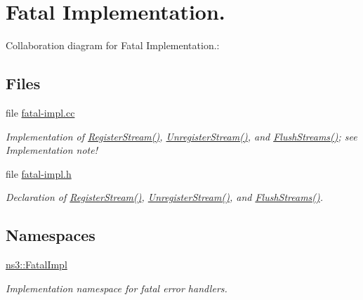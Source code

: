 \hypertarget{group__fatalimpl}{}\section{Fatal Implementation.}
\label{group__fatalimpl}
Collaboration diagram for Fatal Implementation.\+:
\subsection*{Files}
\begin{DoxyCompactItemize}
\item 
file \hyperlink{fatal-impl_8cc}{fatal-\/impl.\+cc}
\begin{DoxyCompactList}\small\item\em Implementation of \hyperlink{group__fatalimpl_gad552ca3d6d85b95147b8c6a2eb4d4579}{Register\+Stream()}, \hyperlink{group__fatalimpl_ga2bf70e98e990f01912527b4ccfac27d0}{Unregister\+Stream()}, and \hyperlink{group__fatalimpl_gad96fb19ef26235aaccd15e6d2a72382f}{Flush\+Streams()}; see Implementation note! \end{DoxyCompactList}\item 
file \hyperlink{fatal-impl_8h}{fatal-\/impl.\+h}
\begin{DoxyCompactList}\small\item\em Declaration of \hyperlink{group__fatalimpl_gad552ca3d6d85b95147b8c6a2eb4d4579}{Register\+Stream()}, \hyperlink{group__fatalimpl_ga2bf70e98e990f01912527b4ccfac27d0}{Unregister\+Stream()}, and \hyperlink{group__fatalimpl_gad96fb19ef26235aaccd15e6d2a72382f}{Flush\+Streams()}. \end{DoxyCompactList}\end{DoxyCompactItemize}
\subsection*{Namespaces}
\begin{DoxyCompactItemize}
\item 
 \hyperlink{namespacens3_1_1FatalImpl}{ns3\+::\+Fatal\+Impl}
\begin{DoxyCompactList}\small\item\em Implementation namespace for fatal error handlers. \end{DoxyCompactList}\end{DoxyCompactItemize}
